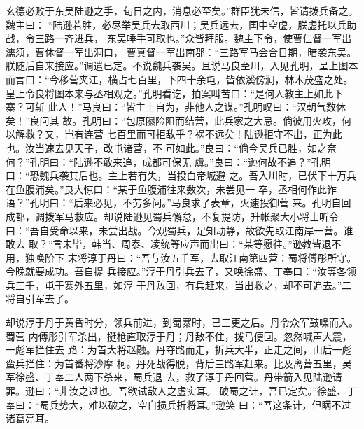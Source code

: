 \documentclass[UTF8,12pt,twoside,a4paper]{ctexart} %
\begin{document}
	\begin{flushleft}

\indent\setlength{\parindent}{2em}%
						\songti
						\hspace{1.6em}%
玄德必败于东吴陆逊之手，旬日之内，消息必至矣。”群臣犹未信，皆请拨兵备之。魏主曰：
“陆逊若胜，必尽举吴兵去取西川；吴兵远去，国中空虚，朕虚托以兵助战，令三路一齐进兵，
东吴唾手可取也。”众皆拜服。魏主下令，使曹仁督一军出濡须，曹休督一军出洞口，
曹真督一军出南郡：“三路军马会合日期，暗袭东吴。朕随后自来接应。”调遣已定。不说魏兵袭吴。且说马良至川，入见孔明，呈上图本而言曰：“今移营夹江，横占七百里，下四十余屯，皆依溪傍涧，林木茂盛之处。皇上令良将图本来与丞相观之。”孔明看讫，拍案叫苦曰：“是何人教主上如此下寨？可斩
此人！”\cite{RN4}马良曰：“皆主上自为，非他人之谋。”孔明叹曰：“汉朝气数休矣！”良问其
故。孔明曰：“包原隰险阻而结营，此兵家之大忌。倘彼用火攻，何以解救？又，岂有连营
七百里而可拒敌乎？祸不远矣！陆逊拒守不出，正为此也。汝当速去见天子，改屯诸营，不
可如此。”良曰：“倘今吴兵已胜，如之奈何？”孔明曰：“陆逊不敢来追，成都可保无
虞。”良曰：“逊何故不追？”孔明曰：“恐魏兵袭其后也。主上若有失，当投白帝城避
之。吾入川时，已伏下十万兵在鱼腹浦矣。”良大惊曰：“某于鱼腹浦往来数次，未尝见一
卒，丞相何作此诈语？”孔明曰：“后来必见，不劳多问。”马良求了表章，火速投御营
来。孔明自回成都，调拨军马救应。却说陆逊见蜀兵懈怠，不复提防，升帐聚大小将士听令
曰：“吾自受命以来，未尝出战。今观蜀兵，足知动静，故欲先取江南岸一营。谁敢去
取？”言未毕，韩当、周泰、凌统等应声而出曰：“某等愿往。”\cite{RN2}逊教皆退不用，独唤阶下
末将淳于丹曰：“吾与汝五千军，去取江南第四营：蜀将傅彤所守。今晚就要成功。吾自提
兵接应。”淳于丹引兵去了，又唤徐盛、丁奉曰：“汝等各领兵三千，屯于寨外五里，如淳
于丹败回，有兵赶来，当出救之，却不可追去。”二将自引军去了。

却说淳于丹于黄昏时分，领兵前进，到蜀寨时，已三更之后。丹令众军鼓噪而入。蜀营
内傅彤引军杀出，挺枪直取淳于丹；丹敌不住，拨马便回。忽然喊声大震，一彪军拦住去
路：为首大将赵融。丹夺路而走，折兵大半，正走之间，山后一彪蛮兵拦住：为首番将沙摩
柯。丹死战得脱，背后三路军赶来。比及离营五里，吴军徐盛、丁奉二人两下杀来，蜀兵退
去，救了淳于丹回营。丹带箭入见陆逊请罪。逊曰：“非汝之过也。吾欲试敌人之虚实耳。
破蜀之计，吾已定矣。”徐盛、丁奉曰：“蜀兵势大，难以破之，空自损兵折将耳。”逊笑
曰：“吾这条计，但瞒不过诸葛亮耳。\cite{RN4}


	\end{flushleft}%
\end{document}
